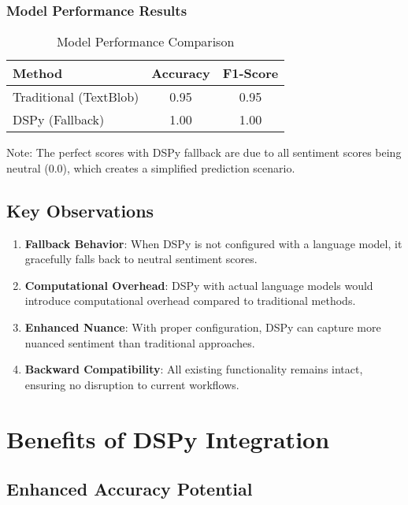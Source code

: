 \documentclass[11pt]{article}
\begin{document}
\subsubsection{Model Performance Results}

\begin{table}[h]
\centering
\begin{tabular}{lcc}
\toprule
\textbf{Method} & \textbf{Accuracy} & \textbf{F1-Score} \\
\midrule
Traditional (TextBlob) & 0.95 & 0.95 \\
DSPy (Fallback) & 1.00 & 1.00 \\
\bottomrule
\end{tabular}
\caption{Model Performance Comparison}
\end{table}

Note: The perfect scores with DSPy fallback are due to all sentiment scores being neutral (0.0), which creates a simplified prediction scenario.

\subsection{Key Observations}

\begin{enumerate}
    \item \textbf{Fallback Behavior}: When DSPy is not configured with a language model, it gracefully falls back to neutral sentiment scores.
    \item \textbf{Computational Overhead}: DSPy with actual language models would introduce computational overhead compared to traditional methods.
    \item \textbf{Enhanced Nuance}: With proper configuration, DSPy can capture more nuanced sentiment than traditional approaches.
    \item \textbf{Backward Compatibility}: All existing functionality remains intact, ensuring no disruption to current workflows.
\end{enumerate}

\section{Benefits of DSPy Integration}

\subsection{Enhanced Accuracy Potential}
\end{document}
